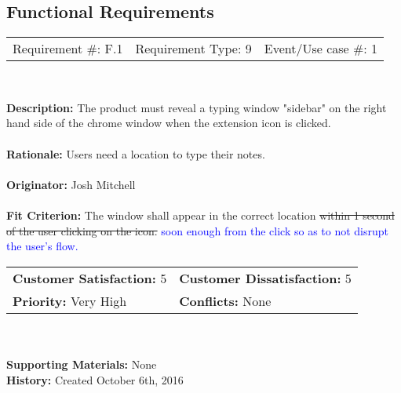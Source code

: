 \documentclass[12pt, titlepage]{article}
\begin{document}
\subsection{Functional Requirements}
\begin{framed}
	
	\begin{center}
		
		\begin{tabular}{ l c r }
			Requirement \#: F.1 & Requirement Type: 9 & Event/Use case \#: 1\\
		\end{tabular} \\
	\end{center}
	\textbf{Description:} The product must reveal a typing window "sidebar" on 
	the right hand side of the chrome window when the extension icon is 
	clicked. \\
	\\
	\textbf{Rationale:} Users need a location to type their notes. \\
	\\
	\textbf{Originator:} Josh Mitchell \\
	\\
	\textbf{Fit Criterion:} The window shall appear in the correct location 
	\sout{within 1 second of the user clicking on the icon.} \textcolor{blue}{ 
	soon enough from the click so as to not disrupt the user's 
	flow.} \\
	
	\begin{tabular}{ll}
		\textbf{Customer Satisfaction:} 5 & \textbf{Customer Dissatisfaction:} 5 \\
		\textbf{Priority:} Very High & \textbf{Conflicts:} None\\
	\end{tabular} \\
	\\
	\textbf{Supporting Materials:} None \\
	\textbf{History:} Created October 6th, 2016
	
\end{framed}
\end{document}
